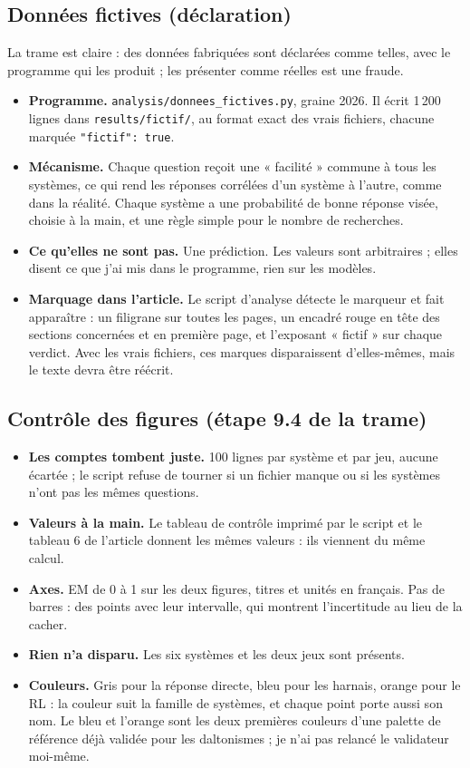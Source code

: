 \documentclass[10pt,a4paper]{article}
\newcommand{\f}[1]{\texttt{\small #1}}
\begin{document}
\subsection*{Données fictives (déclaration)}
La trame est claire : des données fabriquées sont déclarées comme telles, avec le programme qui les produit ; les présenter comme réelles est une fraude.
\begin{itemize}
\item \textbf{Programme.} \f{analysis/donnees\_fictives.py}, graine 2026. Il écrit 1\,200 lignes dans \f{results/fictif/}, au format exact des vrais fichiers, chacune marquée \f{"fictif": true}.
\item \textbf{Mécanisme.} Chaque question reçoit une « facilité » commune à tous les systèmes, ce qui rend les réponses corrélées d'un système à l'autre, comme dans la réalité. Chaque système a une probabilité de bonne réponse visée, choisie à la main, et une règle simple pour le nombre de recherches.
\item \textbf{Ce qu'elles ne sont pas.} Une prédiction. Les valeurs sont arbitraires ; elles disent ce que j'ai mis dans le programme, rien sur les modèles.
\item \textbf{Marquage dans l'article.} Le script d'analyse détecte le marqueur et fait apparaître : un filigrane sur toutes les pages, un encadré rouge en tête des sections concernées et en première page, et l'exposant « fictif » sur chaque verdict. Avec les vrais fichiers, ces marques disparaissent d'elles-mêmes, mais le texte devra être réécrit.
\end{itemize}

\subsection*{Contrôle des figures (étape 9.4 de la trame)}
\begin{itemize}
\item \textbf{Les comptes tombent juste.} 100 lignes par système et par jeu, aucune écartée ; le script refuse de tourner si un fichier manque ou si les systèmes n'ont pas les mêmes questions.
\item \textbf{Valeurs à la main.} Le tableau de contrôle imprimé par le script et le tableau 6 de l'article donnent les mêmes valeurs : ils viennent du même calcul.
\item \textbf{Axes.} EM de 0 à 1 sur les deux figures, titres et unités en français. Pas de barres : des points avec leur intervalle, qui montrent l'incertitude au lieu de la cacher.
\item \textbf{Rien n'a disparu.} Les six systèmes et les deux jeux sont présents.
\item \textbf{Couleurs.} Gris pour la réponse directe, bleu pour les harnais, orange pour le RL : la couleur suit la famille de systèmes, et chaque point porte aussi son nom. Le bleu et l'orange sont les deux premières couleurs d'une palette de référence déjà validée pour les daltonismes ; je n'ai pas relancé le validateur moi-même.
\end{itemize}
\end{document}
